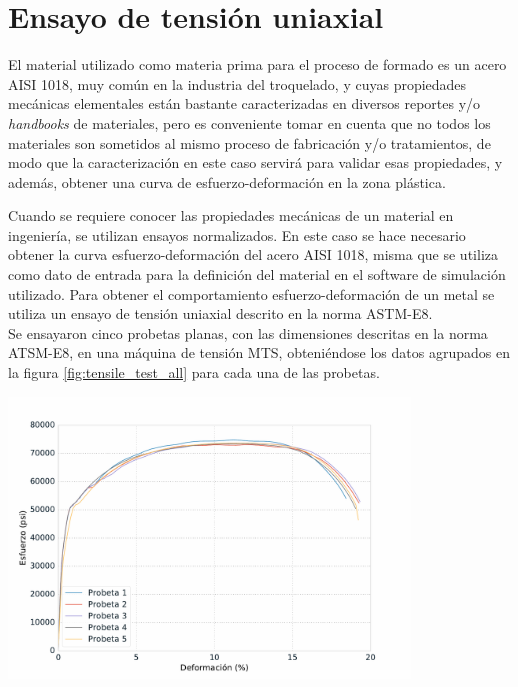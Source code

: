 \section{Ensayo de tensión uniaxial}


El material utilizado como materia prima para el proceso de formado es un acero AISI 1018, 
muy común en la industria del troquelado, y cuyas propiedades mecánicas elementales están 
bastante caracterizadas en diversos reportes y/o \textit{handbooks} de materiales, pero 
es conveniente tomar en cuenta que no todos los materiales son sometidos al mismo proceso 
de fabricación y/o tratamientos, de modo que la caracterización en este caso servirá 
para validar esas propiedades, y además, obtener una curva de esfuerzo-deformación en la 
zona plástica.

Cuando se requiere conocer las propiedades mecánicas de un material en ingeniería, se utilizan ensayos 
normalizados. En este caso se hace necesario obtener la curva esfuerzo-deformación del 
acero AISI 1018, misma que se utiliza como dato de entrada para la definición del material 
en el software de simulación utilizado. Para obtener el comportamiento esfuerzo-deformación 
de un metal se utiliza un ensayo de tensión uniaxial descrito en la norma ASTM-E8. ~\cite{ASTME8} \\

Se ensayaron cinco probetas planas, con las dimensiones descritas en la norma ATSM-E8, en una 
máquina de tensión MTS, obteniéndose los datos agrupados en la figura \ref{fig:tensile_test_all} para 
cada una de las probetas.

\begin{center}
\includegraphics[width=0.8\textwidth]{src/ch3/tensile_test_all.pdf}
\label{fig:tensile_test_all}
\end{center}

